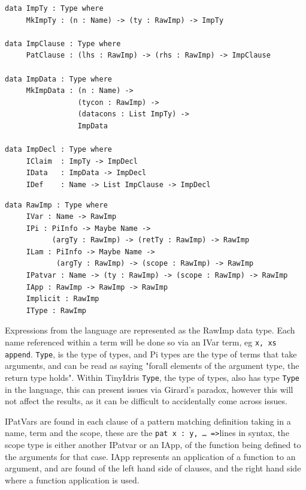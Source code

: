 \documentclass[a4paper]{article}
\begin{document}
\begin{center}
\begin{verbatim}
data ImpTy : Type where
	 MkImpTy : (n : Name) -> (ty : RawImp) -> ImpTy

data ImpClause : Type where
	 PatClause : (lhs : RawImp) -> (rhs : RawImp) -> ImpClause

data ImpData : Type where
	 MkImpData : (n : Name) -> 
				 (tycon : RawImp) ->
				 (datacons : List ImpTy) ->
				 ImpData

data ImpDecl : Type where
	 IClaim  : ImpTy -> ImpDecl
	 IData   : ImpData -> ImpDecl
	 IDef    : Name -> List ImpClause -> ImpDecl
\end{verbatim}
\end{center}

\begin{center}
\begin{verbatim}
data RawImp : Type where
	 IVar : Name -> RawImp
	 IPi : PiInfo -> Maybe Name ->
		   (argTy : RawImp) -> (retTy : RawImp) -> RawImp
	 ILam : PiInfo -> Maybe Name ->
			(argTy : RawImp) -> (scope : RawImp) -> RawImp
	 IPatvar : Name -> (ty : RawImp) -> (scope : RawImp) -> RawImp
	 IApp : RawImp -> RawImp -> RawImp
	 Implicit : RawImp
	 IType : RawImp
\end{verbatim}
\end{center}

Expressions from the language are represented as the RawImp data type.
Each name referenced within a term will be done so via an IVar term, eg
\texttt{x, xs append}. \texttt{Type}, is the type of types, and Pi types are the type
of terms that take arguments, and can be read as saying "forall elements
of the argument type, the return type holds". Within TinyIdris \texttt{Type}, the type of types,
also has type \texttt{Type} in the language, this can present issues via 
Girard's paradox, however this will not affect the results, as it can
be difficult to accidentally come across issues.  

IPatVars are found in each clause of a pattern matching definition 
taking in a name, term and the scope, these are the 
\texttt{pat x : y, \ldots{} =>}lines in syntax, the scope type is either another
IPatvar or an IApp, of the function being defined to the arguments for that case.
IApp represents an application of a function to an argument, and are 
found of the left hand side of clauses, and the right hand side where 
a function application is used.
\end{document}

